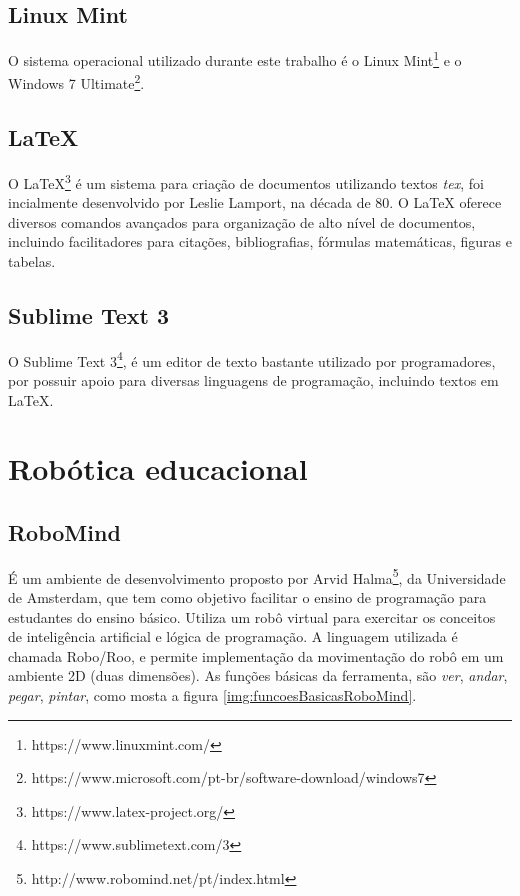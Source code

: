 	\subsection{Linux Mint} %
	\label{sub:linux_mint}
		O sistema operacional utilizado durante este trabalho é o Linux Mint\footnote{https://www.linuxmint.com/} e o Windows 7 Ultimate\footnote{https://www.microsoft.com/pt-br/software-download/windows7}.

	\subsection{LaTeX} %
	\label{sub:latex}
	
	O LaTeX\footnote{https://www.latex-project.org/} é um sistema para criação de documentos utilizando textos \textit{tex}, foi incialmente desenvolvido por Leslie Lamport, na década de 80. O LaTeX oferece diversos comandos avançados para organização de alto nível de documentos, incluindo facilitadores para citações, bibliografias, fórmulas matemáticas, figuras e tabelas.

	\subsection{Sublime Text 3} %
	\label{sub:sublime_text_3}
		O Sublime Text 3\footnote{https://www.sublimetext.com/3}, é um editor de texto bastante utilizado por programadores, por possuir apoio para diversas linguagens de programação, incluindo textos em LaTeX.

\section{Robótica educacional} %
\label{sec:robótica_educacional_suporte}

	\subsection{RoboMind} %
	\label{sub:robomind}

		É um ambiente de desenvolvimento proposto por Arvid Halma\footnote{http://www.robomind.net/pt/index.html}, da Universidade de Amsterdam, que tem como objetivo facilitar o ensino de programação para estudantes do ensino básico. Utiliza um robô virtual para exercitar os conceitos de inteligência artificial e lógica de programação. A linguagem utilizada é chamada Robo/Roo, e permite implementação da movimentação do robô em um ambiente 2D (duas dimensões). As funções básicas da ferramenta, são \textit{ver}, \textit{andar}, \textit{pegar}, \textit{pintar}, como mosta a figura \ref{img:funcoesBasicasRoboMind}.

